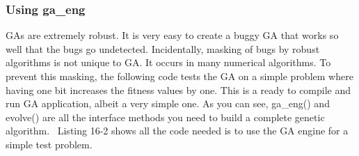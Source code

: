 
\subsubsection{Using ga\_eng}

GAs are extremely robust. It is very easy to create a buggy GA that
works so well that the bugs go undetected. Incidentally, masking of
bugs by robust algorithms is not unique to GA. It occurs in many
numerical algorithms. To prevent this masking, the following code tests
the GA on a simple problem where having one bit increases the fitness
values by one. This is a ready to compile and run GA application,
albeit a very simple one. As you can see, \textsf{ga\_eng()} and
\textsf{evolve()} are all the interface methods you need to build a
complete genetic algorithm. \ Listing 16-2 shows all the code needed is
to use the GA engine for a simple test problem.

